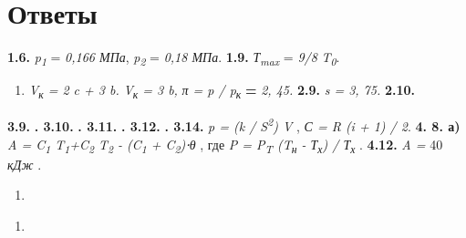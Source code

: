 \chapter{Ответы}

\textbf{1.6.} %
\emph{p\textsubscript{1}} = \emph{0,166 МПа}, \emph{p\textsubscript{2}}
= \emph{0,18 МПа}. \textbf{1.9.} \emph{Т\textsubscript{max}} =
\emph{9/8} \emph{T\textsubscript{0}}.

\begin{enumerate}
\def\labelenumi{\arabic{enumi}.}
\setcounter{enumi}{5}
\item
  \emph{V\textsubscript{к} = 2 c + 3 b.}
  \emph{V\textsubscript{к} = 3 b,}
  \emph{π = p / p\textsubscript{к}} \textbf{=} \emph{2, 45.}
  \textbf{2.9.} \emph{s = 3, 75.}
  \textbf{2.10.}%
\end{enumerate}

\textbf{3.9.}%
\textbf{.
3.10.}%
\textbf{.
3.11.}%
\textbf{.
3.12.}%
\textbf{. 3.14.} 
\emph{p = (k
/ S\textsuperscript{2}) V} , \emph{С = R (i + 1) / 2}. \textbf{4. 8. а)}
\emph{A =
C\textsubscript{1} T\textsubscript{1}+C\textsubscript{2}
T\textsubscript{2} - (C\textsubscript{1} + C\textsubscript{2})⋅θ} , где
\emph{P = P\textsubscript{T} (T\textsubscript{н} - Т\textsubscript{х}) /
Т\textsubscript{х}} . \textbf{4.12.} \emph{A =} 40 \emph{кДж} .

\begin{enumerate}
\def\labelenumi{\arabic{enumi}.}
\setcounter{enumi}{9}
\item
\end{enumerate}

\begin{enumerate}
\def\labelenumi{\arabic{enumi}.}
\setcounter{enumi}{7}
\item
\end{enumerate}

